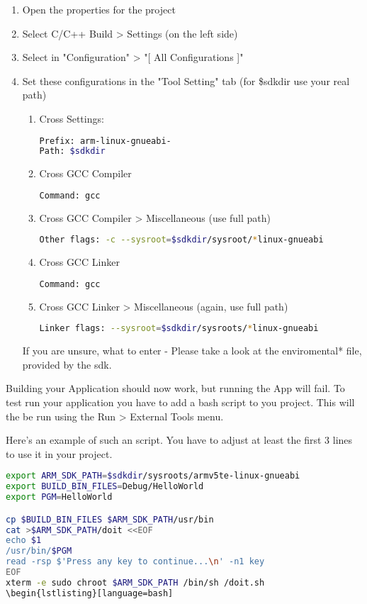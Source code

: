 \begin{enumerate}
\item Open the properties for the project
\item Select C/C++ Build > Settings (on the left side)
\item Select in "Configuration" > "[ All Configurations ]"
\item Set these configurations in the "Tool Setting" tab
(for \$sdkdir use your real path)
\begin{enumerate}
  \item Cross Settings:
\begin{lstlisting}[language=bash]
Prefix: arm-linux-gnueabi-
Path: $sdkdir
\end{lstlisting}
  \item Cross GCC Compiler
\begin{lstlisting}[language=bash]
Command: gcc
\end{lstlisting}
  \item Cross GCC Compiler > Miscellaneous (use full path)
\begin{lstlisting}[language=bash]
Other flags: -c --sysroot=$sdkdir/sysroot/*linux-gnueabi
\end{lstlisting}
  \item Cross GCC Linker
\begin{lstlisting}[language=bash]
Command: gcc
\end{lstlisting}
  \item Cross GCC Linker > Miscellaneous (again, use full path)
\begin{lstlisting}[language=bash]
Linker flags: --sysroot=$sdkdir/sysroots/*linux-gnueabi
\end{lstlisting}
\end{enumerate}
If you are unsure, what to enter - Please take a look at the enviromental* file,
provided by the sdk.
\end{enumerate}

Building your Application should now work, but running the App will fail.
To test run your application you have to add a bash script to you project.
This will the be run using the Run > External Tools menu.

Here's an example of such an script. You have to adjust at least the first 3
lines to use it in your project.

\begin{lstlisting}[language=bash]
export ARM_SDK_PATH=$sdkdir/sysroots/armv5te-linux-gnueabi
export BUILD_BIN_FILES=Debug/HelloWorld
export PGM=HelloWorld

cp $BUILD_BIN_FILES $ARM_SDK_PATH/usr/bin
cat >$ARM_SDK_PATH/doit <<EOF
echo $1
/usr/bin/$PGM
read -rsp $'Press any key to continue...\n' -n1 key
EOF
xterm -e sudo chroot $ARM_SDK_PATH /bin/sh /doit.sh
\begin{lstlisting}[language=bash]
\end{lstlisting}

